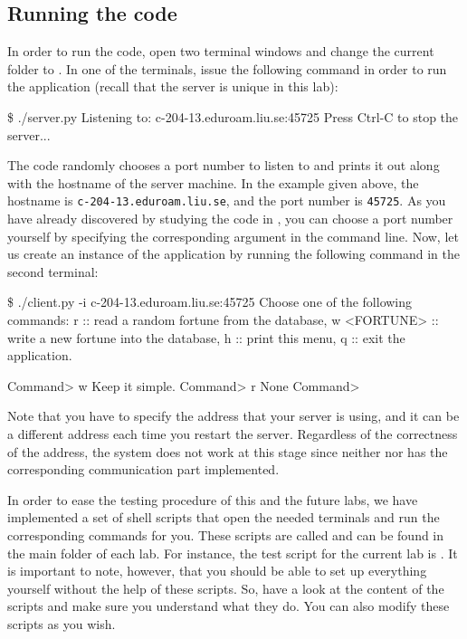 \documentclass[a4paper]{article}
\begin{document}
\subsection{Running the code}
In order to run the code, open two terminal windows and change the
current folder to . In one of the terminals, issue the
following command in order to run the  application
(recall that the server is unique in this lab):
\begin{shell}
\$ ./server.py
Listening to: c-204-13.eduroam.liu.se:45725
Press Ctrl-C to stop the server...
\end{shell}
The code randomly chooses a port number to listen to and prints it out along
with the hostname of the server machine. In the example given above, the
hostname is \texttt{c-204-13.eduroam.liu.se}, and the port number is
\texttt{45725}. As you have already discovered by studying the code in
, you can choose a port number yourself by specifying the
corresponding argument in the command line. Now, let us create an instance of
the  application by running the following command in the
second terminal:
\begin{shell}
\$ ./client.py -i c-204-13.eduroam.liu.se:45725
Choose one of the following commands:
    r            ::  read a random fortune from the database,
    w <FORTUNE>  ::  write a new fortune into the database,
    h            ::  print this menu,
    q            ::  exit the application.

Command> w Keep it simple.
Command> r
None
Command>
\end{shell}

Note that you have to specify the address that your server is using,
and it can be a different address each time you restart the
server. Regardless of the correctness of the address, the system does
not work at this stage since neither  nor
 has the corresponding communication part
implemented.

In order to ease the testing procedure of this and the future labs, we
have implemented a set of shell scripts that open the needed terminals
and run the corresponding commands for you. These scripts are called
 and can be found in the main folder of each
lab. For instance, the test script for the current lab is
. It is important to note, however, that you
should be able to set up everything yourself without the help of these
scripts. So, have a look at the content of the scripts and make sure
you understand what they do. You can also modify these scripts as you
wish.
\end{document}
